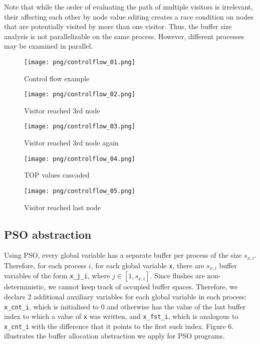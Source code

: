 Note that while the order of evaluating the path of multiple visitors is irrelevant, their affecting each other by node value editing creates a race condition on nodes that are potentially visited by more than one visitor. Thus, the buffer size analysis is not parallelizable on the same process. However, different processes may be examined in parallel.

\begin{figure}[h]

	\caption{Control flow example}
	\centering
	\texttt{[image: png/controlflow\_01.png]}

\end{figure}

\pagebreak

\begin{figure}[h]

	\caption{Visitor reached 3rd node}
	\centering
	\texttt{[image: png/controlflow\_02.png]}

\end{figure}

\begin{figure}[h]

	\caption{Visitor reached 3rd node again}
	\centering
	\texttt{[image: png/controlflow\_03.png]}

\end{figure}

\pagebreak

\begin{figure}[h]

	\caption{TOP values cascaded}
	\centering
	\texttt{[image: png/controlflow\_04.png]}

\end{figure}

\begin{figure}[h]

	\caption{Visitor reached last node}
	\centering
	\texttt{[image: png/controlflow\_05.png]}

\end{figure}

\FloatBarrier

\pagebreak

\subsection{PSO abstraction}

Using PSO, every global variable has a separate buffer per process of the size $s_{x,i}$. Therefore, for each process $i$, for each global variable \lstinline$x$, there are $s_{x,i}$ buffer variables of the form \lstinline$x_j_i$, where $j \in [1, s_{x,i}]$. Since flushes are non-deterministic, we cannot keep track of occupied buffer spaces. Therefore, we declare 2 additional auxiliary variables for each global variable in each process: \lstinline$x_cnt_i$, which is initialised to 0 and otherwise has the value of the last buffer index to which a value of \lstinline$x$ was written, and \lstinline$x_fst_i$, which is analogous to \lstinline$x_cnt_i$ with the difference that it points to the first such index. Figure 6. illustrates the buffer allocation abstraction we apply for PSO programs.\\

